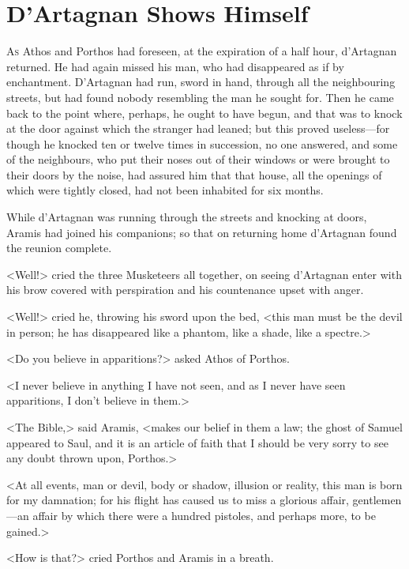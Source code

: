 
\chapter{D'Artagnan Shows Himself}

\lettrine[]{A}{s} Athos and Porthos had foreseen, at the expiration of a half hour, d'Artagnan returned. He had again missed his man, who had disappeared as if by enchantment. D'Artagnan had run, sword in hand, through all the neighbouring streets, but had found nobody resembling the man he sought for. Then he came back to the point where, perhaps, he ought to have begun, and that was to knock at the door against which the stranger had leaned; but this proved useless---for though he knocked ten or twelve times in succession, no one answered, and some of the neighbours, who put their noses out of their windows or were brought to their doors by the noise, had assured him that that house, all the openings of which were tightly closed, had not been inhabited for six months. 

While d'Artagnan was running through the streets and knocking at doors, Aramis had joined his companions; so that on returning home d'Artagnan found the reunion complete. 

<Well!> cried the three Musketeers all together, on seeing d'Artagnan enter with his brow covered with perspiration and his countenance upset with anger. 

<Well!> cried he, throwing his sword upon the bed, <this man must be the devil in person; he has disappeared like a phantom, like a shade, like a spectre.> 

<Do you believe in apparitions?> asked Athos of Porthos. 

<I never believe in anything I have not seen, and as I never have seen apparitions, I don't believe in them.> 

<The Bible,> said Aramis, <makes our belief in them a law; the ghost of Samuel appeared to Saul, and it is an article of faith that I should be very sorry to see any doubt thrown upon, Porthos.> 

<At all events, man or devil, body or shadow, illusion or reality, this man is born for my damnation; for his flight has caused us to miss a glorious affair, gentlemen---an affair by which there were a hundred pistoles, and perhaps more, to be gained.> 

<How is that?> cried Porthos and Aramis in a breath. 

